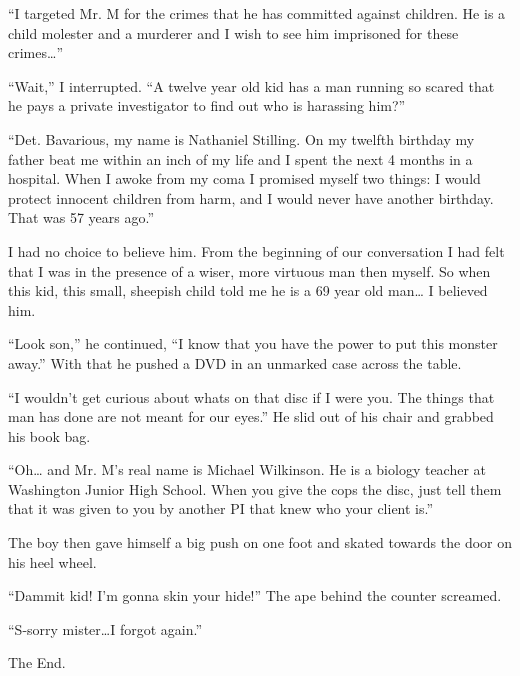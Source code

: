 ``I targeted Mr. M for the crimes that he has committed against
children. He is a child molester and a murderer and I wish to see
him imprisoned for these crimes{\ldots}''



``Wait,'' I interrupted. ``A twelve year old kid has a man running so
scared that he pays a private investigator to find out who is
harassing him?''



``Det. Bavarious, my name is Nathaniel Stilling. On my twelfth
birthday my father beat me within an inch of my life and I spent
the next 4 months in a hospital. When I awoke from my coma I
promised myself two things: I would protect innocent children from
harm, and I would never have another birthday. That was 57 years
ago.''



I had no choice to believe him. From the beginning of our
conversation I had felt that I was in the presence of a wiser, more
virtuous man then myself. So when this kid, this small, sheepish
child told me he is a 69 year old man{\ldots} I believed him.



``Look son,'' he continued, ``I know that you have the power to put
this monster away.'' With that he pushed a DVD in an unmarked case
across the table.



``I wouldn't get curious about whats on that disc if I were you. The
things that man has done are not meant for our eyes.'' He slid out
of his chair and grabbed his book bag.



``Oh{\ldots} and Mr. M's real name is Michael Wilkinson. He is a biology
teacher at Washington Junior High School. When you give the cops
the disc, just tell them that it was given to you by another PI
that knew who your client is.''



The boy then gave himself a big push on one foot and skated towards
the door on his heel wheel.



``Dammit kid! I'm gonna skin your hide!'' The ape behind the counter
screamed.



``S-sorry mister{\ldots}I forgot again.''



The End. 
 



